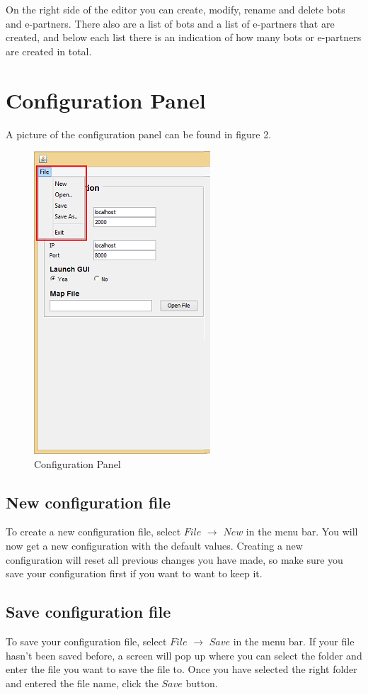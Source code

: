 \documentclass[a4paper]{article}
\begin{document}
On the right side of the editor you can create, modify, rename and delete bots and e-partners. There also are a list of bots and a list of e-partners that are created, and below each list there is an indication of how many bots or e-partners are created in total.
\pagebreak
\section{Configuration Panel}
A picture of the configuration panel can be found in figure 2.
\begin{figure}[h]
\begin{center}
\includegraphics{config.png}
\end{center}
\caption{Configuration Panel}
\end{figure}
\subsection{New configuration file}
To create a new configuration file, select $File$ $\to$ $New$ in the menu bar. You will now get a new configuration with the default values. Creating a new configuration will reset all previous changes you have made, so make sure you save your configuration first if you want to want to keep it.

\subsection{Save configuration file}
To save your configuration file, select $File$ $\to$ $Save$ in the menu bar. If your file hasn't been saved before, a screen will pop up where you can select the folder and enter the file you want to save the file to. Once you have selected the right folder and entered the file name, click the $Save$ button.
\end{document}
